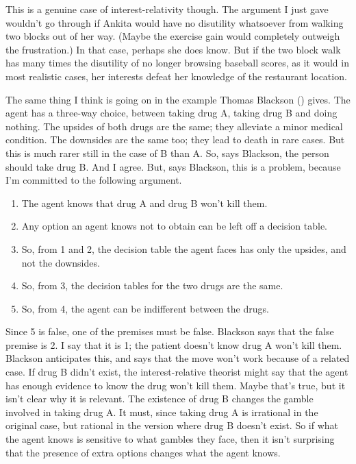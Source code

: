 \documentclass[
  11pt,
  letterpaper,
  DIV=11,
  numbers=noendperiod]{scrartcl}
\providecommand{\tightlist}{%
  \setlength{\itemsep}{0pt}\setlength{\parskip}{0pt}}\usepackage{longtable,booktabs,array}
\begin{document}
This is a genuine case of interest-relativity though. The argument I
just gave wouldn't go through if Ankita would have no disutility
whatsoever from walking two blocks out of her way. (Maybe the exercise
gain would completely outweigh the frustration.) In that case, perhaps
she does know. But if the two block walk has many times the disutility
of no longer browsing baseball scores, as it would in most realistic
cases, her interests defeat her knowledge of the restaurant location.

The same thing I think is going on in the example Thomas Blackson
() gives. The agent has a three-way
choice, between taking drug A, taking drug B and doing nothing. The
upsides of both drugs are the same; they alleviate a minor medical
condition. The downsides are the same too; they lead to death in rare
cases. But this is much rarer still in the case of B than A. So, says
Blackson, the person should take drug B. And I agree. But, says
Blackson, this is a problem, because I'm committed to the following
argument.

\begin{enumerate}
\def\labelenumi{\arabic{enumi}.}
\tightlist
\item
  The agent knows that drug A and drug B won't kill them.
\item
  Any option an agent knows not to obtain can be left off a decision
  table.
\item
  So, from 1 and 2, the decision table the agent faces has only the
  upsides, and not the downsides.
\item
  So, from 3, the decision tables for the two drugs are the same.
\item
  So, from 4, the agent can be indifferent between the drugs.
\end{enumerate}

Since 5 is false, one of the premises must be false. Blackson says that
the false premise is 2. I say that it is 1; the patient doesn't know
drug A won't kill them. Blackson anticipates this, and says that the
move won't work because of a related case. If drug B didn't exist, the
interest-relative theorist might say that the agent has enough evidence
to know the drug won't kill them. Maybe that's true, but it isn't clear
why it is relevant. The existence of drug B changes the gamble involved
in taking drug A. It must, since taking drug A is irrational in the
original case, but rational in the version where drug B doesn't exist.
So if what the agent knows is sensitive to what gambles they face, then
it isn't surprising that the presence of extra options changes what the
agent knows.
\end{document}
